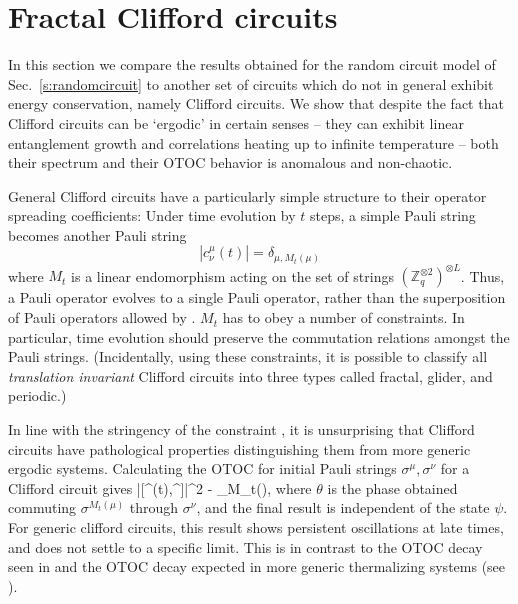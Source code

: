\documentclass[aps,prb,twocolumn,superscriptaddress]{revtex4-1}
\begin{document}
 \section{Fractal Clifford circuits}\label{s:Clifford}
In this section we compare the results obtained for the random circuit model of Sec.~\ref{s:randomcircuit} to another set of circuits which do not in general exhibit energy conservation, namely  Clifford circuits. We show that despite the fact that Clifford circuits can be `ergodic' in certain senses -- they can exhibit linear entanglement growth and correlations heating up to infinite temperature -- both their spectrum and their OTOC behavior is anomalous and non-chaotic. 

General Clifford circuits have a particularly simple structure to their operator spreading coefficients: Under time evolution by $t$ steps, a simple Pauli string becomes another Pauli string
\begin{equation}\label{eq:Clifford}
|c_\nu^\mu(t)| = \delta_{\mu,M_t(\mu)}
\end{equation}
where $M_t$ is a linear endomorphism acting on the set of strings $\left(\mathbb{Z}_{q}^{\otimes2}\right)^{\otimes L}$. Thus, a Pauli operator evolves to a single Pauli operator, rather than the superposition of Pauli operators allowed by . $M_t$ has to obey a number of constraints. In particular, time evolution should preserve the commutation relations amongst the Pauli strings\cite{Schlingemann08,Gutschow09,Gutschow10}. (Incidentally, using these constraints, it is possible to classify all  \textit{translation invariant} Clifford circuits into three types called fractal, glider, and periodic\cite{Gutschow09,Gutschow10}.) 
 
In line with the stringency of the constraint , it is unsurprising that Clifford circuits have pathological properties distinguishing them from more generic ergodic systems.  Calculating  the OTOC  for initial Pauli strings $\sigma^\mu,\sigma^\nu$ for a Clifford circuit gives
\be
 \langle\psi\mid|[\sigma^{\mu}(t),\sigma^{\nu}]|^{2} \mid \psi {} - \cos \theta_{M_t(\mu),\nu}
\ee
where $\theta$ is the phase obtained commuting $\sigma^{M_t(\mu)}$ through $\sigma^{\nu}$, and the final result is independent of the state $\psi$. For generic clifford circuits, this result shows persistent oscillations at late times, and does not settle to a specific limit. This is in contrast to the OTOC decay seen in  and the OTOC decay expected in more generic thermalizing systems (see ). 
\end{document}
